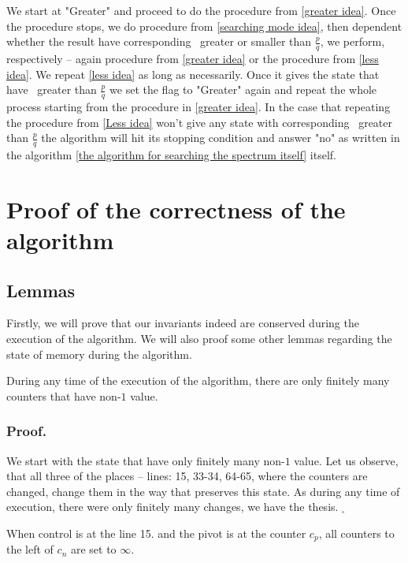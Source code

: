 We start at "Greater" and proceed to do the procedure from \ref{greater idea}. 
Once the procedure stops, we do procedure from \ref{searching mode idea}, then 
dependent whether the result have corresponding \Eoc\ greater or smaller than $\frac{p}{q}$, 
we perform, respectively -- again procedure from \ref{greater idea} or the 
procedure from \ref{less idea}. We repeat \ref{less idea} as long as necessarily. 
Once it gives the state that have \Eoc\ greater than $\frac{p}{q}$ we set the flag to 
"Greater" again and repeat the whole process starting from the procedure in \ref{greater idea}. 
In the case that repeating the procedure from \ref{Less idea} won't give any state with 
corresponding \Eoc\ greater than $\frac{p}{q}$ the algorithm will hit its stopping condition 
and answer "no" as written in the algorithm 
\ref{the algorithm for searching the spectrum itself} itself.   
\section{Proof of the correctness of the algorithm}\label{memory state proof}
\subsection{Lemmas}\label{lemmas for the proof of the correctness}
Firstly, we will prove that our invariants indeed are conserved during the execution 
of the algorithm. We will also proof some other lemmas regarding the state of memory 
during the algorithm.

\begin{lemma}
During any time of the execution of the algorithm, there are only finitely many counters 
that have non-$1$ value.
\end{lemma}
\subsubsection{Proof.}
We start with the state that have only finitely many non-$1$ value. Let us observe, that 
all three of the places -- lines: 15, 33-34, 64-65, 
where the counters are changed, change them in the way 
that preserves this state. As during any time of execution, there were only finitely many 
changes, we have the thesis. $_\square$

\begin{lemma}\label{Greater infinities to the left lemma}
When control is at the line 15. and the pivot is at the counter $c_p$, all counters 
to the left of $c_n$ are set to $\infty$. 
\end{lemma}
